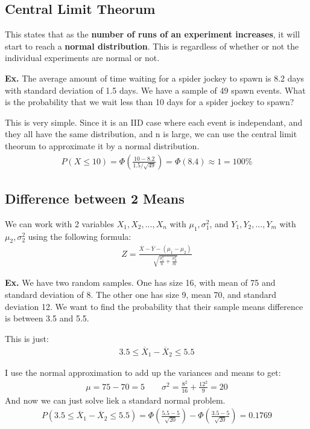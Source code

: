 \documentclass[12pt,letterpaper]{article} \usepackage{amsmath} \usepackage{graphicx} \usepackage[margin=1in]{geometry} \usepackage{longtable}  \usepackage{amssymb}
\begin{document}
	
	
	\subsection{Central Limit Theorum}
	This states that as the \textbf{number of runs of an experiment increases}, it will start to reach a \textbf{normal distribution}. This is regardless of whether or not the individual experiments are normal or not.
	
	\begin{mdframed}
		\textbf{Ex.} The average amount of time waiting for a spider jockey to spawn is 8.2 days with standard deviation of 1.5 days. We have a sample of 49 spawn events. What is the probability that we wait less than 10 days for a spider jockey to spawn?
		
		This is very simple. Since it is an IID case where each event is independant, and they all have the same distribution, and n is large, we can use the central limit theorum to approximate it by a normal distribution. 
		\begin{align*}
			P(X \le 10) = \Phi \left(\frac{10-8.2}{1.5/\sqrt {49}}\right) = \Phi(8.4) \approx 1 = 100\%
		\end{align*}
	\end{mdframed} 
	
	\subsection{Difference between 2 Means}
	We can work with 2 variables $X_1, X_2, ..., X_n$ with $\mu_1, \sigma^2_1$, and $Y_1, Y_2, ..., Y_m$ with $\mu_2, \sigma_2^2$ using the following formula:
	\begin{align*}
		Z = \frac{\overline X - \overline Y - (\mu_1 - \mu_2)}{\sqrt{\frac{\sigma_1^2}{n}+\frac{\sigma^2_2}{m}}}
	\end{align*}

	\begin{mdframed}
		\textbf{Ex.} We have two random samples. One has size 16, with mean of 75 and standard deviation of 8. The other one has size 9, mean 70, and standard deviation 12. We want to find the probability that their sample means difference is between 3.5 and 5.5.
		
		This is just:
		\begin{align*}
			3.5\le \overline X_1 - \overline X_2 \le 5.5
		\end{align*}
	
		I use the normal approximation to add up the variances and means to get:
		\begin{align*}
			\mu = 75-70 = 5 \qquad \sigma^2 = \frac{8^2}{16} + \frac{12^2}{9} = 20
		\end{align*}
		And now we can just solve liek a standard normal problem. 
		\begin{align*}
			P(3.5\le \overline X_1 - \overline X_2 \le 5.5) = \Phi\left(\frac{5.5-5}{\sqrt {20}}\right) - \Phi\left(\frac{3.5-5}{\sqrt {20}}\right) =0.1769
		\end{align*}
	\end{mdframed}
\end{document}
